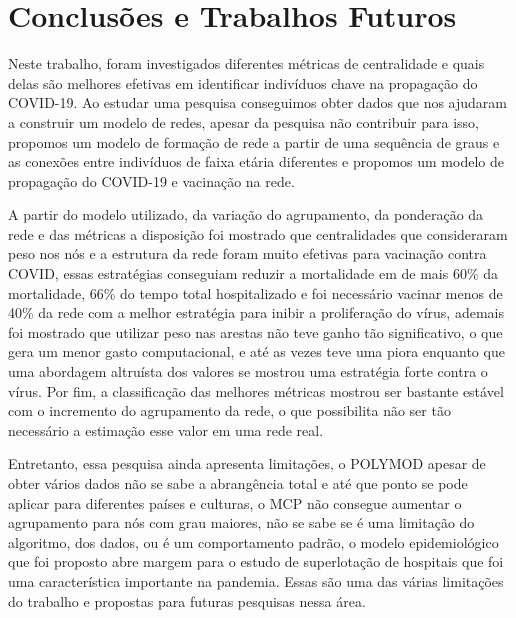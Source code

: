 \chapter{Conclusões e Trabalhos Futuros}
\label{chap:conclusoes-e-trabalhos-futuros}

Neste trabalho, foram investigados diferentes métricas de centralidade e quais delas são melhores efetivas em identificar indivíduos chave na propagação do COVID-19. Ao estudar uma pesquisa conseguimos obter dados que nos ajudaram a construir um modelo de redes, apesar da pesquisa não contribuir para isso, propomos um modelo de formação de rede a partir de uma sequência de graus e as conexões entre indivíduos de faixa etária diferentes e propomos um modelo de propagação do COVID-19 e vacinação na rede.

A partir do modelo utilizado, da variação do agrupamento, da ponderação da rede e das métricas a disposição foi mostrado que centralidades que consideraram peso nos nós e a estrutura da rede foram muito efetivas para vacinação contra COVID, essas estratégias conseguiam reduzir a mortalidade em de mais 60\% da mortalidade, 66\% do tempo total hospitalizado e foi necessário vacinar menos de 40\% da rede com a melhor estratégia para inibir a proliferação do vírus, ademais foi mostrado que utilizar peso nas arestas não teve ganho tão significativo, o que gera um menor gasto computacional, e até as vezes teve uma piora enquanto que uma abordagem altruísta dos valores se mostrou uma estratégia forte contra o vírus. Por fim, a classificação das melhores métricas mostrou ser bastante estável com o incremento do agrupamento da rede, o que possibilita não ser tão necessário a estimação esse valor em uma rede real.
    
Entretanto, essa pesquisa ainda apresenta limitações, o POLYMOD apesar de obter vários dados não se sabe a abrangência total e até que ponto se pode aplicar para diferentes países e culturas, o MCP não consegue aumentar o agrupamento para nós com grau maiores, não se sabe se é uma limitação do algoritmo, dos dados, ou é um comportamento padrão, o modelo epidemiológico que foi proposto abre margem para o estudo de superlotação de hospitais que foi uma característica importante na pandemia. Essas são uma das várias limitações do trabalho e propostas para futuras pesquisas nessa área.
